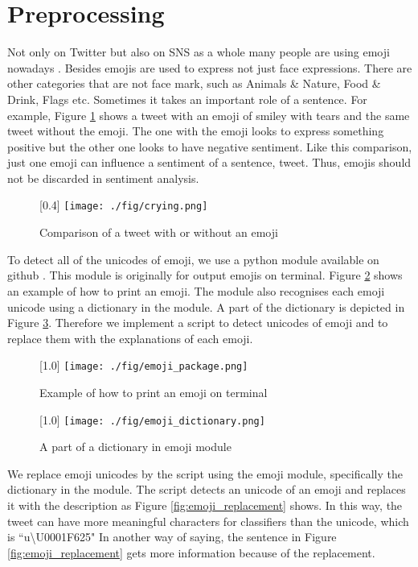 \section{Preprocessing}
Not only on Twitter but also on SNS as a whole many people are using emoji nowadays \cite{emoji}.
Besides emojis are used to express not just face expressions.
There are other categories that are not face mark, such as Animals \& Nature, Food \& Drink, Flags etc.
Sometimes it takes an important role of a sentence.
For example, Figure \ref{fig:crying} shows a tweet with an emoji of smiley with tears and the same tweet without the emoji.
The one with the emoji looks to express something positive but the other one looks to have negative sentiment.
Like this comparison, just one emoji can influence a sentiment of a sentence, tweet.
Thus, emojis should not be discarded in sentiment analysis.
\begin{figure}
	\centering
	\scalebox{0.4}[0.4]{
	\texttt{[image: ./fig/crying.png]}
	}
	\caption{Comparison of a tweet with or without an emoji}
	\label{fig:crying}
\end{figure}


To detect all of the unicodes of emoji, we use a python module available on github \cite{emoji_package}. 
This module is originally for output emojis on terminal.
Figure \ref{fig:thumbs_up} shows an example of how to print an emoji.
The module also recognises each emoji unicode using a dictionary in the module.
A part of the dictionary is depicted in Figure \ref{fig:emoji_dict}.
Therefore we implement a script to detect unicodes of emoji and to replace them with the explanations of each emoji.


\begin{figure}
	\centering
	\scalebox{1.0}[1.0]{
	\texttt{[image: ./fig/emoji\_package.png]}
	}
	\caption{Example of how to print an emoji on terminal}
	\label{fig:thumbs_up}
\end{figure}


\begin{figure}
	\centering
	\scalebox{1.0}[1.0]{
	\texttt{[image: ./fig/emoji\_dictionary.png]}
	}
	\caption{A part of a dictionary in emoji module}
	\label{fig:emoji_dict}
\end{figure}


We replace emoji unicodes by the script using the emoji module, specifically the dictionary in the module.
The script detects an unicode of an emoji and replaces it with the description as Figure \ref{fig:emoji_replacement} shows.
In this way, the tweet can have more meaningful characters for classifiers than the unicode, which is ``u\textbackslash U0001F625"
In another way of saying, the sentence in Figure \ref{fig:emoji_replacement} gets more information because of the replacement.

